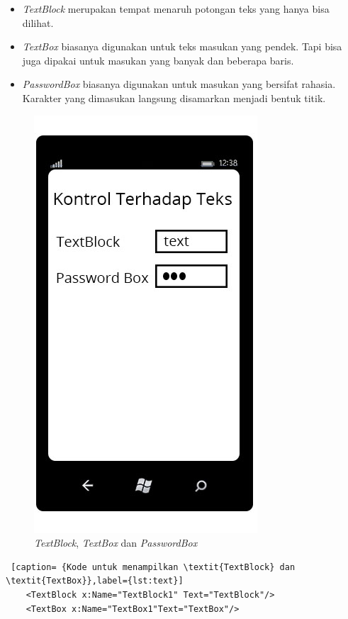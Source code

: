\begin{itemize}
	\item \textit{TextBlock} merupakan tempat menaruh potongan teks yang hanya bisa dilihat.
	\item \textit{TextBox} biasanya digunakan untuk teks masukan yang pendek. Tapi bisa juga dipakai untuk masukan yang banyak dan beberapa baris.
	\item \textit{PasswordBox} biasanya digunakan untuk masukan yang bersifat rahasia. Karakter yang dimasukan langsung disamarkan menjadi bentuk titik.
\end{itemize}

\begin{figure}[h]
	\centering
		\includegraphics[scale=0.5]{Gambar/Tombol/kontrol_teks}
	\caption{\textit{TextBlock}, \textit{TextBox} dan \textit{PasswordBox}}
	\label{fig:kontrol_teks}
\end{figure}

\begin{lstlisting} [caption= {Kode untuk menampilkan \textit{TextBlock} dan \textit{TextBox}},label={lst:text}]
	<TextBlock x:Name="TextBlock1" Text="TextBlock"/>
	<TextBox x:Name="TextBox1"Text="TextBox"/>
\end{lstlisting}


